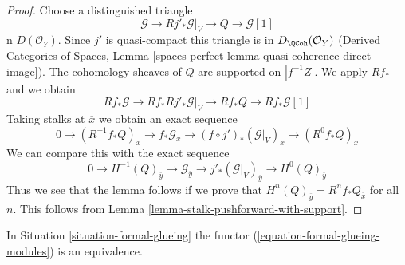 \begin{proof}
Choose a distinguished triangle
$$
\mathcal{G} \to Rj'_*\mathcal{G}|_V \to Q \to \mathcal{G}[1]
$$
n $D(\mathcal{O}_Y)$. Since $j'$ is quasi-compact this triangle is
in $D_\QCoh(\mathcal{O}_Y)$
(Derived Categories of Spaces, Lemma
\ref{spaces-perfect-lemma-quasi-coherence-direct-image}).
The cohomology sheaves of $Q$
are supported on $|f^{-1}Z|$. We apply $Rf_*$ and we obtain
$$
Rf_*\mathcal{G} \to Rf_*Rj'_*\mathcal{G}|_V \to Rf_*Q
\to Rf_*\mathcal{G}[1]
$$
Taking stalks at $\overline{x}$ we obtain an exact sequence
$$
0 \to
(R^{-1}f_*Q)_{\overline{x}} \to
f_*\mathcal{G}_{\overline{x}} \to
(f \circ j')_*(\mathcal{G}|_V)_{\overline{x}} \to
(R^0f_*Q)_{\overline{x}}
$$
We can compare this with the exact sequence
$$
0 \to
H^{-1}(Q)_{\overline{y}} \to
\mathcal{G}_{\overline{y}} \to
j'_*(\mathcal{G}|_V)_{\overline{y}} \to
H^0(Q)_{\overline{y}}
$$
Thus we see that the lemma follows if we prove that
$H^n(Q)_{\overline{y}} = R^nf_*Q_{\overline{x}}$ for all $n$.
This follows from Lemma \ref{lemma-stalk-pushforward-with-support}.
\end{proof}

\begin{proposition}
\label{proposition-formal-glueing-modules}
In Situation \ref{situation-formal-glueing} the functor
(\ref{equation-formal-glueing-modules}) is an equivalence.
\end{proposition}

